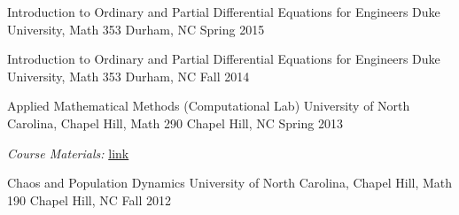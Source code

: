 
\begin{cventries}

  \cventry
    {Introduction to Ordinary and Partial Differential Equations for Engineers} %
    {Duke University, Math 353} %
    {Durham, NC} %
    {Spring 2015} %
     {
     }

  \cventry
    {Introduction to Ordinary and Partial Differential Equations for Engineers} %
    {Duke University, Math 353} %
    {Durham, NC} %
    {Fall 2014} %
     {
     }

  \cventry
    {Applied Mathematical Methods (Computational Lab)} %
    {University of North Carolina, Chapel Hill, Math 290} %
    {Chapel Hill, NC} %
    {Spring 2013} %
     {
    \begin{cvitems} %
    \item {\textit{Course Materials:} \href{https://github.com/ajbaird/computational_math}{link}}
    \end{cvitems}
     }

  \cventry
    {Chaos and Population Dynamics } %
    {University of North Carolina, Chapel Hill, Math 190} %
    {Chapel Hill, NC} %
    {Fall 2012} %
     {
     }



\end{cventries}

